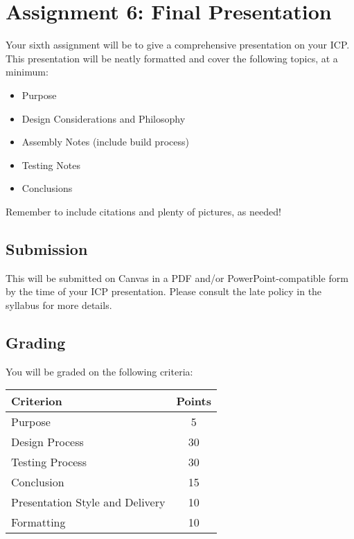 \section*{Assignment 6: Final Presentation}
Your sixth assignment will be to give a comprehensive presentation on your ICP.
This presentation will be neatly formatted and cover the following topics, at a minimum:
    
    \begin{itemize}
        \item Purpose
        \item Design Considerations and Philosophy
        \item Assembly Notes (include build process)
        \item Testing Notes
        \item Conclusions
    \end{itemize}
    
    Remember to include citations and plenty of pictures, as needed!
        
        \subsection*{Submission}
        This will be submitted on Canvas in a PDF and/or PowerPoint-compatible form by the time of your ICP presentation.
        Please consult the late policy in the syllabus for more details.
    
        \subsection*{Grading}
        You will be graded on the following criteria:
    
        \begin{table}[h!]
            \begin{tabular}{l | c}
                \toprule
                Criterion & Points \\
                \midrule
                Purpose & 5 \\
                Design Process & 30 \\
                Testing Process & 30 \\
                Conclusion & 15 \\
                Presentation Style and Delivery & 10 \\
                Formatting & 10 \\
                \bottomrule
            \end{tabular}
        \end{table}

